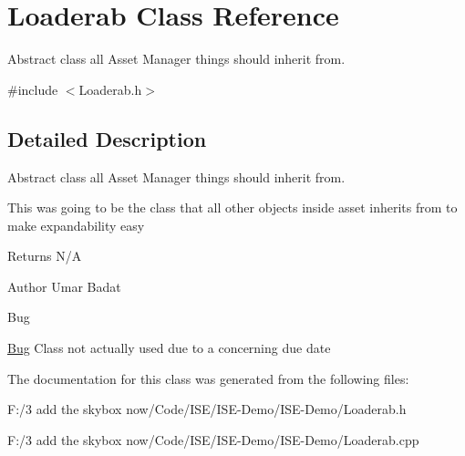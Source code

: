 \hypertarget{class_loaderab}{\section{Loaderab Class Reference}
\label{class_loaderab}
}


Abstract class all Asset Manager things should inherit from.  




{\ttfamily \#include $<$Loaderab.\-h$>$}



\subsection{Detailed Description}
Abstract class all Asset Manager things should inherit from. 

This was going to be the class that all other objects inside asset inherits from to make expandability easy \begin{DoxyReturn}{Returns}
N/\-A
\end{DoxyReturn}
\begin{DoxyAuthor}{Author}
Umar Badat 
\end{DoxyAuthor}
\begin{DoxyRefDesc}{Bug}
\item[\hyperlink{bug__bug000003}{Bug}]Class not actually used due to a concerning due date \end{DoxyRefDesc}


The documentation for this class was generated from the following files\-:\begin{DoxyCompactItemize}
\item 
F\-:/3 add the skybox now/\-Code/\-I\-S\-E/\-I\-S\-E-\/\-Demo/\-I\-S\-E-\/\-Demo/Loaderab.\-h\item 
F\-:/3 add the skybox now/\-Code/\-I\-S\-E/\-I\-S\-E-\/\-Demo/\-I\-S\-E-\/\-Demo/Loaderab.\-cpp\end{DoxyCompactItemize}
